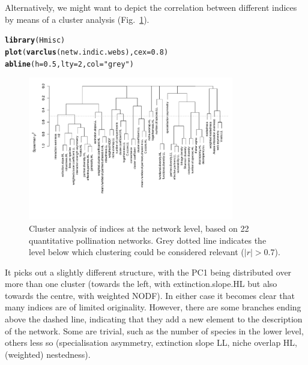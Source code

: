 \documentclass[a4paper, 11pt]{article}\usepackage[]{graphicx}\usepackage[]{color}
\makeatletter
\newcommand{\hlnum}[1]{\textcolor[rgb]{0.686,0.059,0.569}{#1}}%
\newcommand{\hlstr}[1]{\textcolor[rgb]{0.192,0.494,0.8}{#1}}%
\newcommand{\hlstd}[1]{\textcolor[rgb]{0.345,0.345,0.345}{#1}}%
\newcommand{\hlkwc}[1]{\textcolor[rgb]{0.333,0.667,0.333}{#1}}%
\newcommand{\hlkwd}[1]{\textcolor[rgb]{0.737,0.353,0.396}{\textbf{#1}}}%
\newenvironment{kframe}{%
 \def\at@end@of@kframe{}%
 \ifinner\ifhmode%
  \def\at@end@of@kframe{\end{minipage}}%
  \begin{minipage}{\columnwidth}%
 \fi\fi%
 \def\FrameCommand##1{\hskip\@totalleftmargin \hskip-\fboxsep
 \colorbox{shadecolor}{##1}\hskip-\fboxsep
     \hskip-\linewidth \hskip-\@totalleftmargin \hskip\columnwidth}%
 \MakeFramed {\advance\hsize-\width
   \@totalleftmargin\z@ \linewidth\hsize
   \@setminipage}}%
 {\par\unskip\endMakeFramed%
 \at@end@of@kframe}
\newenvironment{knitrout}{}{} %
\makeatother
\begin{document}
Alternatively, we might want to depict the correlation between different indices by means of a cluster analysis (Fig.~\ref{fig:clusternetworklevel}).
\begin{knitrout}
\color{fgcolor}\begin{kframe}
\begin{alltt}
\hlkwd{library}\hlstd{(Hmisc)}
\hlkwd{plot}\hlstd{(}\hlkwd{varclus}\hlstd{(netw.indic.webs),} \hlkwc{cex}\hlstd{=}\hlnum{0.8}\hlstd{)}
\hlkwd{abline}\hlstd{(}\hlkwc{h}\hlstd{=}\hlnum{0.5}\hlstd{,} \hlkwc{lty}\hlstd{=}\hlnum{2}\hlstd{,} \hlkwc{col}\hlstd{=}\hlstr{"grey"}\hlstd{)}
\end{alltt}
\end{kframe}
\end{knitrout}
\begin{figure}
\centering
\includegraphics[width=0.8\textwidth]{figures/clusternetworklevel}
\caption{Cluster analysis of indices at the network level, based on 22 quantitative pollination networks. Grey dotted line indicates the level below which clustering could be considered relevant ($|r| > 0.7$).}
\label{fig:clusternetworklevel}
\end{figure}
%
It picks out a slightly different structure, with the PC1 being distributed over more than one cluster (towards the left, with extinction.slope.HL but also towards the centre, with weighted NODF). In either case it becomes clear that many indices are of limited originality. However, there are some branches ending above the dashed line, indicating that they add a new element to the description of the network. Some are trivial, such as the number of species in the lower level, others less so (specialisation asymmetry, extinction slope LL, niche overlap HL, (weighted) nestedness). 
\end{document}
